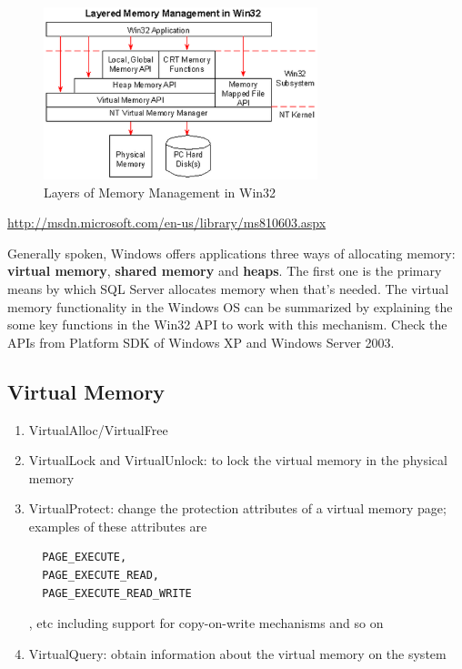 \begin{figure}[hbt]
  \centerline{\includegraphics[height=5cm,
    angle=0]{./images/memory-management-win32.eps}}
  \caption{Layers of Memory Management in Win32}
\label{fig:memory-management-Win32}
\end{figure}

\url{http://msdn.microsoft.com/en-us/library/ms810603.aspx}

Generally spoken, Windows offers applications three ways of allocating memory:
{\bf virtual memory}, {\bf shared memory} and {\bf heaps}. The first one is the
primary means by which SQL Server allocates memory when that's needed. The
virtual memory functionality in the Windows OS can be summarized by explaining
the some key functions in the Win32 API to work with this mechanism. Check the
APIs from Platform SDK of Windows XP and Windows Server 2003.

\subsection{Virtual Memory}
\label{sec:virtual-mem-alloc-Win32}

\begin{enumerate}
  \item VirtualAlloc/VirtualFree
  
  \item VirtualLock and VirtualUnlock: to lock the virtual memory in the
  physical memory
  
  \item VirtualProtect: change the protection attributes of a virtual memory
  page; examples of these attributes are 
  \begin{verbatim}
  PAGE_EXECUTE, 
  PAGE_EXECUTE_READ,
  PAGE_EXECUTE_READ_WRITE
  \end{verbatim}
  , etc including support for copy-on-write mechanisms and so on
  
  \item VirtualQuery: obtain information about the virtual memory on the system 
\end{enumerate}

